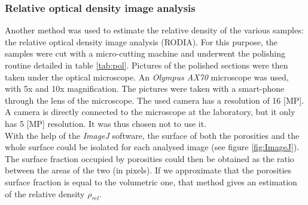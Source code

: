 \subsubsection{Relative optical density image analysis}

Another method was used to estimate the relative density of the various samples: the relative optical density image analysis (RODIA). For this purpose, the samples were cut with a micro-cutting machine and underwent the polishing routine detailed in table \ref{tab:pol}. Pictures of the polished sections were then taken under the optical microscope. An \textit{Olympus AX70} microscope was used, with 5x and 10x magnification. The pictures were taken with a smart-phone through the lens of the microscope. The used camera has a resolution of 16 [MP]. A camera is directly connected to the microscope at the laboratory, but it only has 5 [MP] resolution. It was thus chosen not to use it. \\

With the help of the \textit{ImageJ} software, the surface of both the porosities and the whole surface could be isolated for each analysed image (see figure \ref{fig:ImageJ}). The surface fraction occupied by porosities could then be obtained as the ratio between the areas of the two (in pixels). If we approximate that the porosities surface fraction is equal to the volumetric one, that method gives an estimation of the relative density $\rho_{rel}$.

\begin{center}
\begin{table}[ht]
\noindent{}

\caption[Polishing routine for Al-Si alloys]{Polishing routine for Al-Si alloys}
\label{tab:pol}
\end{table}
\end{center}

